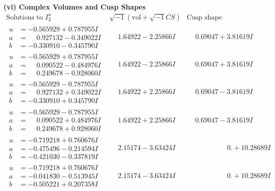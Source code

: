 \documentclass[1p]{elsarticle_modified}
\theoremstyle{definition}
\newcommand{\I}{\sqrt{-1}}
\begin{document}
\newpage\flushleft \textbf{(vi) Complex Volumes and Cusp Shapes}
$$\begin{array}{c|c|c}  
\text{Solutions to }I^u_{2}& \I (\text{vol} + \sqrt{-1}CS) & \text{Cusp shape}\\
 \hline 
\begin{aligned}
u &= -0.565929 + 0.787955 I \\
a &= \phantom{-}0.927132 - 0.349022 I \\
b &= -0.330910 - 0.345790 I\end{aligned}
 & \phantom{-}1.64922 - 2.25866 I & \phantom{-}0.69047 + 3.81619 I \\ \hline\begin{aligned}
u &= -0.565929 + 0.787955 I \\
a &= \phantom{-}0.090522 - 0.484976 I \\
b &= \phantom{-}0.249678 - 0.928060 I\end{aligned}
 & \phantom{-}1.64922 - 2.25866 I & \phantom{-}0.69047 + 3.81619 I \\ \hline\begin{aligned}
u &= -0.565929 - 0.787955 I \\
a &= \phantom{-}0.927132 + 0.349022 I \\
b &= -0.330910 + 0.345790 I\end{aligned}
 & \phantom{-}1.64922 + 2.25866 I & \phantom{-}0.69047 - 3.81619 I \\ \hline\begin{aligned}
u &= -0.565929 - 0.787955 I \\
a &= \phantom{-}0.090522 + 0.484976 I \\
b &= \phantom{-}0.249678 + 0.928060 I\end{aligned}
 & \phantom{-}1.64922 + 2.25866 I & \phantom{-}0.69047 - 3.81619 I \\ \hline\begin{aligned}
u &= -0.719218 + 0.760676 I \\
a &= -0.475496 - 0.214594 I \\
b &= -0.421030 - 0.337819 I\end{aligned}
 & \phantom{-}2.15174 - 3.63424 I & \phantom{-0.000000 -}0. + 10.28689 I \\ \hline\begin{aligned}
u &= -0.719218 + 0.760676 I \\
a &= -0.041830 - 0.513945 I \\
b &= -0.505221 + 0.207358 I\end{aligned}
 & \phantom{-}2.15174 - 3.63424 I & \phantom{-0.000000 -}0. + 10.28689 I \\ \hline\begin{aligned}

\end{aligned}
\end{array}$$
\end{document}
